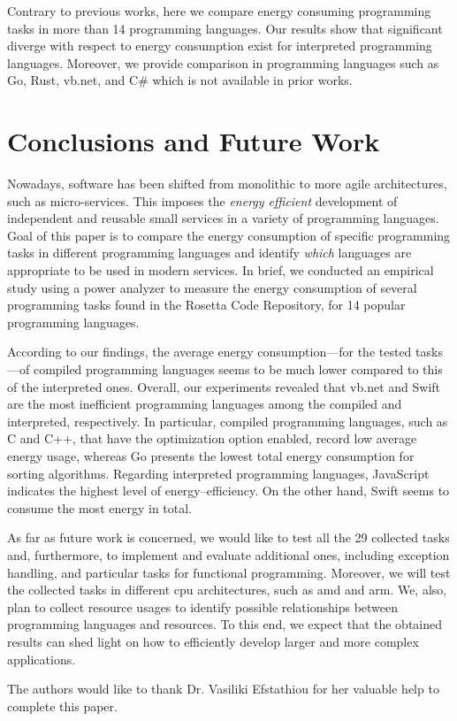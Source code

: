 Contrary to previous works, here we compare energy consuming 
programming tasks in more than 14 programming languages.
Our results show that significant diverge with respect to 
energy consumption exist for interpreted programming languages. 
Moreover, we provide comparison in programming languages such 
as Go, Rust, {\sc vb.net}, and C\# which is not available in 
prior works.


\section{Conclusions and Future Work} \label{conclusiona_and_future_work}

Nowadays, software has been shifted from
monolithic to more agile architectures, such as micro-services.
This imposes the {\it energy efficient} development of independent and reusable
small services in a variety of programming languages.
Goal of this paper is to compare the energy consumption
of specific programming tasks in different programming languages
and identify {\it which} languages are appropriate to be used in modern services.
In brief, we conducted an empirical study
using a power analyzer to measure the energy consumption
of several programming tasks found in the Rosetta Code Repository,
for 14 popular programming languages.

According to our findings,
the average energy consumption---for the tested tasks---of 
compiled programming languages
seems to be much lower compared to this of the interpreted ones.
Overall, our experiments revealed that {\sc vb.net} and Swift are 
the most inefficient programming languages among the compiled 
and interpreted, respectively.
In particular, compiled programming languages, such as 
C and C++, that have the optimization option enabled,
record low average energy usage, whereas Go presents the lowest 
total energy consumption for sorting algorithms. 
Regarding interpreted programming languages,
JavaScript indicates the highest level of energy--efficiency.
On the other hand, Swift seems to consume the most energy in total.

As far as future work is concerned,
we would like to test all the 29 collected 
tasks and, furthermore, to implement and evaluate additional ones,
including exception handling,
and particular tasks for functional programming. 
Moreover, we will test the collected tasks in different {\sc cpu} 
architectures, such as {\sc amd} and {\sc arm}. 
We, also, plan to collect resource usages to identify 
possible relationships between programming languages and resources. 
To this end, we expect that the obtained results can shed light
on how to efficiently develop larger and more complex applications.

\begin{acks}
	The authors would like to thank Dr. Vasiliki Efstathiou for her 
	valuable help to complete this paper.
\end{acks}


